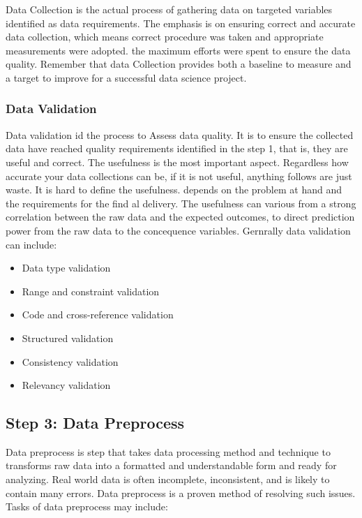 \documentclass[
]{book}
\providecommand{\tightlist}{%
  \setlength{\itemsep}{0pt}\setlength{\parskip}{0pt}}
\begin{document}
Data Collection is the actual process of gathering data on targeted variables identified as data requirements. The emphasis is on ensuring correct and accurate data collection, which means correct procedure was taken and appropriate measurements were adopted. the maximum efforts were spent to ensure the data quality. Remember that data Collection provides both a baseline to measure and a target to improve for a successful data science project.

\hypertarget{data-validation}{%
\subsubsection*{Data Validation}\label{data-validation}}


Data validation id the process to Assess data quality. It is to ensure the collected data have reached quality requirements identified in the step 1, that is, they are useful and correct. The usefulness is the most important aspect. Regardless how accurate your data collections can be, if it is not useful, anything follows are just waste. It is hard to define the usefulness. depends on the problem at hand and the requirements for the find al delivery. The usefulness can various from a strong correlation between the raw data and the expected outcomes, to direct prediction power from the raw data to the concequence variables. Gernrally data validation can include:

\begin{itemize}
\tightlist
\item
  Data type validation
\item
  Range and constraint validation
\item
  Code and cross-reference validation
\item
  Structured validation
\item
  Consistency validation
\item
  Relevancy validation
\end{itemize}

\hypertarget{preprocess}{%
\subsection*{Step 3: Data Preprocess}\label{preprocess}}


Data preprocess is step that takes data processing method and technique to transforms raw data into a formatted and understandable form and ready for analyzing. Real world data is often incomplete, inconsistent, and is likely to contain many errors. Data preprocess is a proven method of resolving such issues. Tasks of data preprocess may include:
\end{document}
